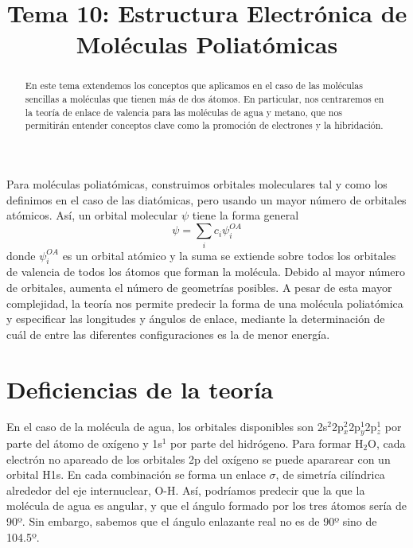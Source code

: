 \documentclass{tufte-handout}
\title[Química Física II: Tema 10 - Moléculas poliatómicas]{
Tema 10: Estructura Electrónica de Moléculas Poliatómicas}
\date{}  %
\begin{document}
\maketitle%

\begin{abstract}
\noindent 
En este tema extendemos los conceptos que aplicamos en
el caso de las moléculas sencillas a moléculas que tienen
más de dos átomos. En particular, nos centraremos en la 
teoría de enlace de valencia para las moléculas de
agua y metano, que nos permitirán entender 
conceptos clave como la promoción de electrones y la
hibridación.
\end{abstract}




\section{}

Para moléculas poliatómicas, construimos orbitales
moleculares tal y como los definimos en el caso de
las diatómicas, pero usando un mayor número de
orbitales atómicos. Así, un orbital molecular $\psi$
tiene la forma general
\begin{equation}
    \psi = \sum_ic_i\psi_i^{OA}
\end{equation}
donde $\psi_i^{OA}$ es un orbital atómico y la
suma se extiende sobre todos los orbitales de valencia
de todos los átomos que forman la molécula.
Debido al mayor número de orbitales, aumenta el
número de geometrías posibles. A pesar de esta mayor
complejidad, la teoría nos permite predecir la
forma de una molécula poliatómica y especificar las
longitudes y ángulos de enlace, mediante la 
determinación de cuál de entre las diferentes 
configuraciones es la de menor energía. 

\section{Deficiencias de la teoría}
En el caso de la molécula de agua, los orbitales
disponibles son 2s$^2$2p$_x^2$2p$_y^1$2p$_z^1$
por parte del átomo de oxígeno y 1s$^1$ por parte
del hidrógeno. Para formar H$_2$O, cada electrón
no apareado de los orbitales 2p del oxígeno se
puede apararear con un orbital H1s. En cada
combinación se forma un enlace $\sigma$, de
simetría cilíndrica alrededor del eje internuclear,
O-H. Así, podríamos predecir que la que la
molécula de agua es angular, y que el ángulo 
formado por los tres átomos sería de 90º. Sin embargo,
sabemos que el ángulo enlazante real no es de 90º sino
de 104.5º.
\end{document}
